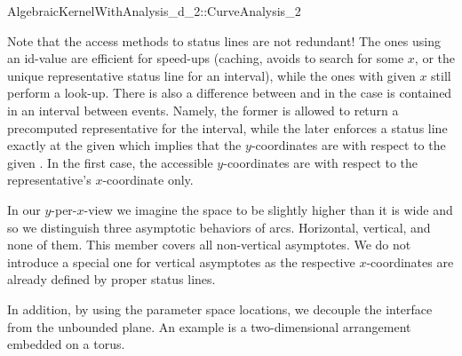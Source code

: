 \begin{ccRefConcept}{AlgebraicKernelWithAnalysis_d_2::CurveAnalysis_2}

Note that the access methods to status lines are not redundant! The ones
using an id-value are efficient for speed-ups (caching, avoids to search for
some $x$, or the unique representative status line for an interval),
while the ones with given $x$ still perform a look-up. There is also a 
difference between  and 
 in the case  is contained 
in an interval between events. Namely, the former is allowed to return a
precomputed representative for the interval, while the later enforces
a status line exactly at the given  which implies that the 
$y$-coordinates are with respect to the given . In the first case,
the accessible $y$-coordinates are with respect to the representative's 
$x$-coordinate only.

%
%


In our $y$-per-$x$-view we imagine the space to be slightly 
higher than it is wide and so we distinguish three asymptotic behaviors
of arcs. Horizontal, vertical, and none of them. This member covers 
all non-vertical asymptotes. We do not introduce a special one
for vertical asymptotes as the respective $x$-coordinates are already defined
by proper status lines.

In addition, by using the parameter space locations, 
we decouple the interface from the unbounded plane. An example is a 
two-dimensional arrangement embedded on a torus.

\end{ccRefConcept}
